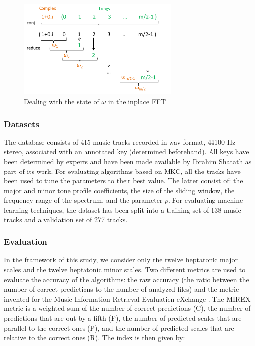 \documentclass[letterpaper]{article}
\begin{document}
\begin{figure}[h!]
\begin{center}
\includegraphics[width=3.1in,angle=0]{imgs/reduceconj.png}
\caption{Dealing with the state of $\omega$ in the inplace FFT}
\label{fig3}
\end{center}
\end{figure}

\subsubsection{Datasets}

The database consists of 415 music tracks recorded in wav format, 44100 Hz stereo, associated with an annotated key (determined beforehand). 
All keys have been determined
by experts and have been made available by Ibrahim Shat\textquotesingle ath as part of its work. For evaluating algorithms based on MKC,
all the tracks have been used to tune the parameters to their best value. The latter consist of: the major and minor tone profile coefficients,
the size of the sliding window, the frequency range of the spectrum, and the parameter $p$. For evaluating machine learning techniques,
the dataset has been split into a training set of 138 music tracks and a validation set of 277 tracks.

\subsubsection{Evaluation}

In the framework of this study, we consider only the twelve heptatonic major scales and the twelve heptatonic minor scales.
Two different metrics are used to evaluate the accuracy of the algorithms:
the raw accuracy (the ratio between the number of correct predictions to the number of analyzed files) and the metric invented for the Music Information Retrieval Evaluation eXchange \citep{MIREX}.
The MIREX metric is a weighted sum of the number of correct predictions (C), the number of predictions that are out by a fifth (F), the number of predicted scales that are parallel to the correct ones (P), and the number of predicted scales
that are relative to the correct ones (R). The index is then given by: \\
\end{document}
